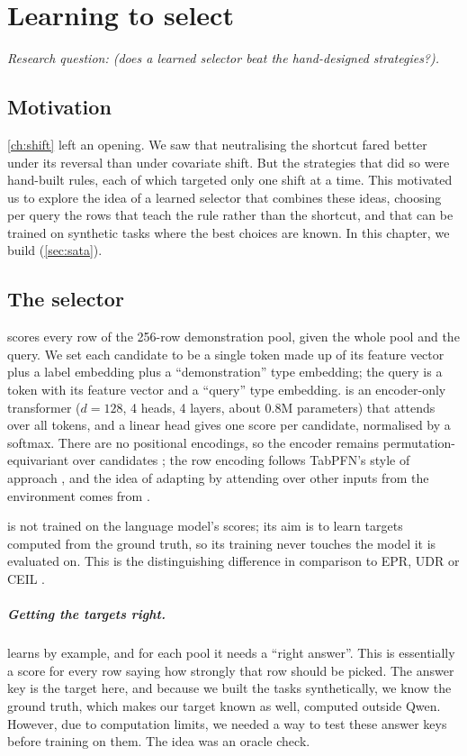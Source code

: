 \chapter{Learning to select}
\label{ch:sata}

\emph{Research question:  (does a learned selector beat the hand-designed strategies?).}

\section{Motivation}

\autoref{ch:shift} left an opening. We saw that neutralising the shortcut fared better under its reversal than under covariate shift. But the strategies that did so were hand-built rules, each of which targeted only one shift at a time. This motivated us to explore the idea of a learned selector that combines these ideas, choosing per query the rows that teach the rule rather than the shortcut, and that can be trained on synthetic tasks where the best choices are known. In this chapter, we build \sata (\autoref{sec:sata}).


\section{The selector}
\label{sec:sata-arch}
\sata scores every row of the 256-row demonstration pool, given the whole pool and the query. We set each candidate to be a single token made up of its feature vector plus a label embedding plus a ``demonstration'' type embedding; the query is a token with its feature vector and a ``query'' type embedding. \sata is an encoder-only transformer ($d = 128$, 4 heads, 4 layers, about 0.8M parameters) that attends over all tokens, and a linear head gives one score per candidate, normalised by a softmax. There are no positional encodings, so the encoder remains permutation-equivariant over candidates \citep{lee2019set}; the row encoding follows TabPFN's style of approach \citep{hollmann2023tabpfn}, and the idea of adapting by attending over other inputs from the environment comes from \citet{gupta2024context}.

\sata is not trained on the language model's scores; its aim is to learn targets computed from the ground truth, so its training never touches the model it is evaluated on. This is the distinguishing difference in comparison to EPR, UDR or CEIL \citep{rubin2022learning,li2023unified,ye2023compositional}.

\paragraph{Getting the targets right.}
\label{sec:sata-targets}
\sata learns by example, and for each pool it needs a ``right answer''. This is essentially a score for every row saying how strongly that row should be picked. The answer key is the target here, and because we built the tasks synthetically, we know the ground truth, which makes our target known as well, computed outside Qwen. However, due to computation limits, we needed a way to test these answer keys before training \sata on them. The idea was an oracle check.

